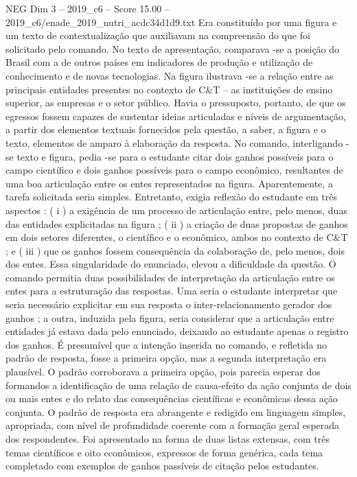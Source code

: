 \begin{textsample}{NEG Dim 3 – 2019\_c6 – Score 15.00 – 2019\_c6/enade\_2019\_nutri\_acdc34d1d9.txt}
Era constituído por uma figura e um texto de contextualização que auxiliavam na compreensão do que foi solicitado pelo comando.
No texto de apresentação, comparava -se a posição do Brasil com a de outros países em indicadores de produção e utilização de conhecimento e de novas tecnologias.
Na figura ilustrava -se a relação entre as principais entidades presentes no contexto de C\&T – as instituições de ensino superior, as empresas e o setor público.
Havia o pressuposto, portanto, de que os egressos fossem capazes de sustentar ideias articuladas e níveis de argumentação, a partir dos elementos textuais fornecidos pela questão, a saber, a figura e o texto, elementos de amparo à elaboração da resposta.
No comando, interligando -se texto e figura, pedia -se para o estudante citar dois ganhos possíveis para o campo científico e dois ganhos possíveis para o campo econômico, resultantes de uma boa articulação entre os entes representados na figura.
Aparentemente, a tarefa solicitada seria simples.
Entretanto, exigia reflexão do estudante em três aspectos : ( i ) a exigência de um processo de articulação entre, pelo menos, duas das entidades explicitadas na figura ; ( ii ) a criação de duas propostas de ganhos em dois setores diferentes, o científico e o econômico, ambos no contexto de C\&T ; e ( iii ) que os ganhos fossem consequência da colaboração de, pelo menos, dois dos entes.
Essa singularidade do enunciado, elevou a dificuldade da questão.
O comando permitia duas possibilidades de interpretação da articulação entre os entes para a estruturação das respostas.
Uma seria o estudante interpretar que seria necessário explicitar em sua resposta o inter-relacionamento gerador dos ganhos ; a outra, induzida pela figura, seria considerar que a articulação entre entidades já estava dada pelo enunciado, deixando ao estudante apenas o registro dos ganhos.
É presumível que a intenção inserida no comando, e refletida no padrão de resposta, fosse a primeira opção, mas a segunda interpretação era plausível.
O padrão corroborava a primeira opção, pois parecia esperar dos formandos a identificação de uma relação de causa-efeito da ação conjunta de dois ou mais entes e do relato das consequências científicas e econômicas dessa ação conjunta.
O padrão de resposta era abrangente e redigido em linguagem simples, apropriada, com nível de profundidade coerente com a formação geral esperada dos respondentes.
Foi apresentado na forma de duas listas extensas, com três temas científicos e oito econômicos, expressos de forma genérica, cada tema completado com exemplos de ganhos passíveis de citação pelos estudantes.

\end{textsample}
